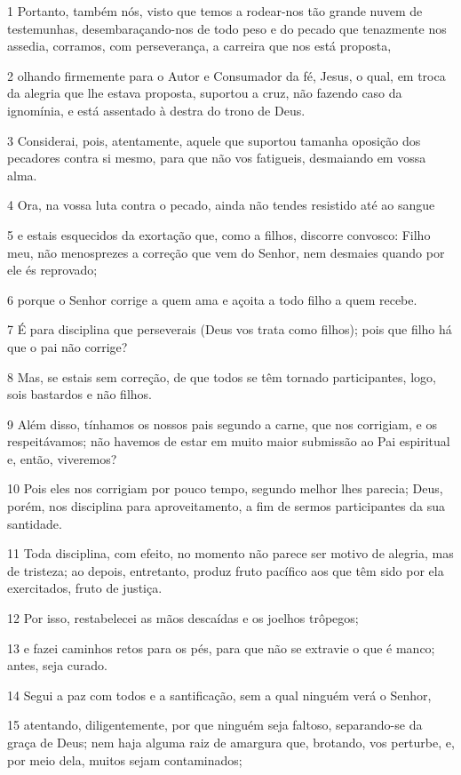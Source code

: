 \par 1 Portanto, também nós, visto que temos a rodear-nos tão grande nuvem de testemunhas, desembaraçando-nos de todo peso e do pecado que tenazmente nos assedia, corramos, com perseverança, a carreira que nos está proposta,
\par 2 olhando firmemente para o Autor e Consumador da fé, Jesus, o qual, em troca da alegria que lhe estava proposta, suportou a cruz, não fazendo caso da ignomínia, e está assentado à destra do trono de Deus.
\par 3 Considerai, pois, atentamente, aquele que suportou tamanha oposição dos pecadores contra si mesmo, para que não vos fatigueis, desmaiando em vossa alma.
\par 4 Ora, na vossa luta contra o pecado, ainda não tendes resistido até ao sangue
\par 5 e estais esquecidos da exortação que, como a filhos, discorre convosco: Filho meu, não menosprezes a correção que vem do Senhor, nem desmaies quando por ele és reprovado;
\par 6 porque o Senhor corrige a quem ama e açoita a todo filho a quem recebe.
\par 7 É para disciplina que perseverais (Deus vos trata como filhos); pois que filho há que o pai não corrige?
\par 8 Mas, se estais sem correção, de que todos se têm tornado participantes, logo, sois bastardos e não filhos.
\par 9 Além disso, tínhamos os nossos pais segundo a carne, que nos corrigiam, e os respeitávamos; não havemos de estar em muito maior submissão ao Pai espiritual e, então, viveremos?
\par 10 Pois eles nos corrigiam por pouco tempo, segundo melhor lhes parecia; Deus, porém, nos disciplina para aproveitamento, a fim de sermos participantes da sua santidade.
\par 11 Toda disciplina, com efeito, no momento não parece ser motivo de alegria, mas de tristeza; ao depois, entretanto, produz fruto pacífico aos que têm sido por ela exercitados, fruto de justiça.
\par 12 Por isso, restabelecei as mãos descaídas e os joelhos trôpegos;
\par 13 e fazei caminhos retos para os pés, para que não se extravie o que é manco; antes, seja curado.
\par 14 Segui a paz com todos e a santificação, sem a qual ninguém verá o Senhor,
\par 15 atentando, diligentemente, por que ninguém seja faltoso, separando-se da graça de Deus; nem haja alguma raiz de amargura que, brotando, vos perturbe, e, por meio dela, muitos sejam contaminados;
